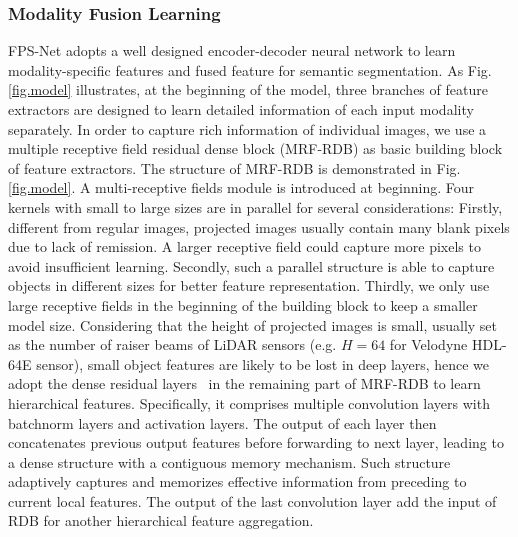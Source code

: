 \documentclass[preprint,review,3p]{elsarticle}
\begin{document}
\subsubsection{Modality Fusion Learning}\label{Sec.domain_fusion_learn}
FPS-Net adopts a well designed encoder-decoder neural network to learn modality-specific features  and fused feature for semantic segmentation. 
As Fig. \ref{fig.model} illustrates, at the beginning of the model, three branches of feature extractors are designed to learn detailed information of each input modality separately. In order to capture rich information of individual images, we use a multiple receptive field residual dense block (MRF-RDB) as basic building block of feature extractors. The structure of MRF-RDB is demonstrated in Fig. \ref{fig.model}. A multi-receptive fields module is introduced at beginning. Four kernels with small to large sizes are in parallel for several considerations: Firstly, different from regular images, projected images usually contain many blank pixels due to lack of remission. A larger receptive field could capture more pixels to avoid insufficient learning. Secondly, such a parallel structure is able to capture objects in different sizes for better feature representation. Thirdly, we only use large receptive fields in the beginning of the building block to keep a smaller model size. Considering that the height of projected images is small, usually set as the number of raiser beams of LiDAR sensors (e.g. $H=64$ for Velodyne HDL-64E sensor), small object features are likely to be lost in deep layers, hence we adopt the dense residual layers~\cite{zhang2018residual} in the remaining part of MRF-RDB to learn hierarchical features. Specifically, it comprises multiple convolution layers with batchnorm layers and activation layers. The output of each layer then concatenates previous output features before forwarding to next layer, leading to a dense structure with a contiguous memory mechanism. Such structure adaptively captures and memorizes effective information from preceding to current local features. The output of the last convolution layer add the input of RDB for another hierarchical feature aggregation. 
\end{document}
